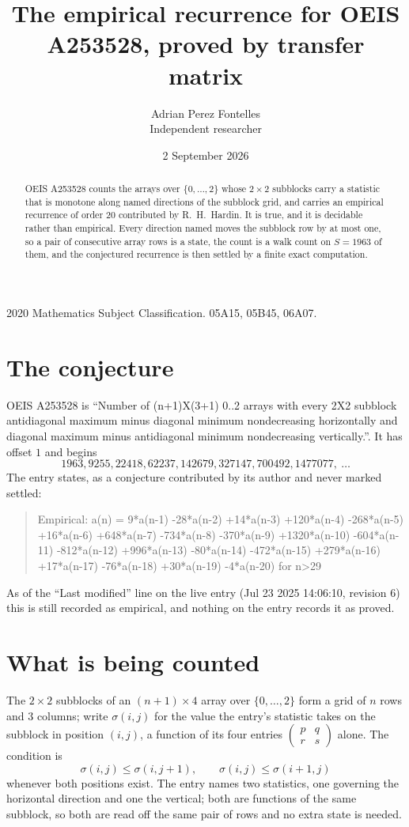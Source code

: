 \documentclass[11pt,a4paper]{article}
\title{The empirical recurrence for OEIS A253528, proved by transfer matrix}
\author{Adrian Perez Fontelles\\ \small Independent researcher}
\date{2 September 2026}
\theoremstyle{plain}
\theoremstyle{definition}
\begin{document}
\maketitle

\begin{abstract}
OEIS A253528 counts the arrays over $\{0,\dots,2\}$ whose $2\times2$ subblocks carry a
statistic that is monotone along named directions of the subblock grid, and carries an
empirical recurrence of order $20$ contributed by R.~H.~Hardin. It is true, and it is
decidable rather than empirical. Every direction named moves the subblock row by at most one,
so a pair of consecutive array rows is a state, the count is a walk count on $S=1963$ of them,
and the conjectured recurrence is then settled by a finite exact computation.
\end{abstract}

\noindent\small 2020 Mathematics Subject Classification. 05A15, 05B45, 06A07.\normalsize

\section{The conjecture}

OEIS A253528 is ``Number of (n+1)X(3+1) 0..2 arrays with every 2X2 subblock antidiagonal maximum minus diagonal minimum nondecreasing horizontally and diagonal maximum minus antidiagonal minimum nondecreasing vertically.''. It has offset $1$ and begins
\[
1963, 9255, 22418, 62237, 142679, 327147, 700492, 1477077,\ \dots
\]
The entry states, as a conjecture contributed by its author and never marked settled:
\begin{quote}
Empirical: a(n) = 9*a(n-1) -28*a(n-2) +14*a(n-3) +120*a(n-4) -268*a(n-5) +16*a(n-6) +648*a(n-7) -734*a(n-8) -370*a(n-9) +1320*a(n-10) -604*a(n-11) -812*a(n-12) +996*a(n-13) -80*a(n-14) -472*a(n-15) +279*a(n-16) +17*a(n-17) -76*a(n-18) +30*a(n-19) -4*a(n-20) for n>29
\end{quote}
As of the ``Last modified'' line on the live entry (Jul 23 2025 14:06:10, revision 6) this is still
recorded as empirical, and nothing on the entry records it as proved.

\section{What is being counted}

The $2\times2$ subblocks of an $(n+1)\times4$ array over $\{0,\dots,2\}$ form a grid
of $n$ rows and $3$ columns; write $\sigma(i,j)$ for the value the entry's statistic takes on
the subblock in position $(i,j)$, a function of its four entries
$\begin{pmatrix}p&q\\r&s\end{pmatrix}$ alone. The condition is
\[
\sigma(i,j)\le\sigma(i,j+1),\qquad \sigma(i,j)\le\sigma(i+1,j)
\]
whenever both positions exist. The entry names two statistics, one governing the horizontal direction and one the vertical; both are functions of the same subblock, so both are read off the same pair of rows and no extra state is needed.
\end{document}
